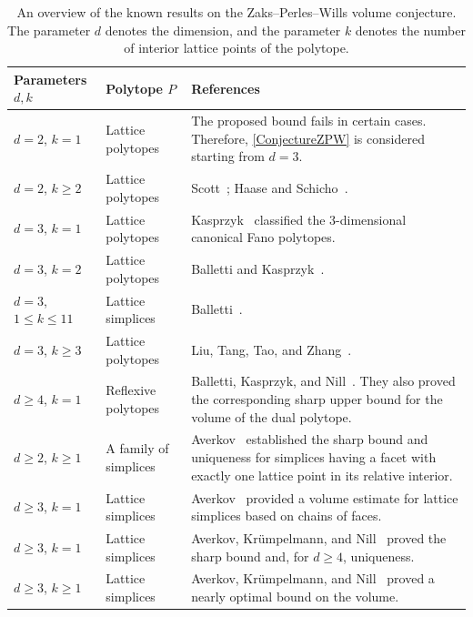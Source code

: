 \documentclass[reqno, 11pt]{article}
\numberwithin{equation}{section}
\theoremstyle{definition}
\begin{document}
\begin{table}[htbp]
\centering\small
\begin{tabularx}{\textwidth}{l|l|>{\raggedright\arraybackslash}X}
\toprule
Parameters $d,k$ & Polytope $P$ & References\\
\midrule
$d=2$, $k=1$ & Lattice polytopes &
The proposed bound fails in certain cases. Therefore,
\cref{ConjectureZPW} is considered starting from $d=3$.\\
$d=2$, $k\geq2$ & Lattice polytopes &
Scott~\cite{Scott1976}; Haase and Schicho~\cite{HaaseSch09}.\\
\hline
$d=3$, $k=1$ & Lattice polytopes &
Kasprzyk~\cite{Kas10} classified the $3$-dimensional canonical Fano
polytopes.\\
$d=3$, $k=2$ & Lattice polytopes &
Balletti and Kasprzyk~\cite[Corollary~5.2]{BK2016}.\\
$d=3$, $1\leq k\leq11$ & Lattice simplices &
Balletti~\cite[Corollary~7.5 and Theorem~7.7]{Bal21}.\\
$d=3$, $k\geq3$ & Lattice polytopes &
Liu, Tang, Tao, and Zhang~\cite{LTTZ26}.\\
\hline
$d\geq4$, $k=1$ & Reflexive polytopes &
Balletti, Kasprzyk, and Nill~\cite[Corollary~1.2]{BKN22}.
They also proved the corresponding sharp upper bound for the volume
of the dual polytope.\\
$d\geq2$, $k\geq1$ & A family of simplices &
Averkov~\cite[Theorem~3]{ALocal} established the sharp bound and
uniqueness for simplices having a facet with exactly one lattice point
in its relative interior.\\
$d\geq3$, $k=1$ & Lattice simplices &
Averkov~\cite{Ave12} provided a volume estimate for lattice simplices
based on chains of faces.\\
$d\geq3$, $k=1$ & Lattice simplices &
Averkov, Kr\"umpelmann, and Nill~\cite[Theorem~2.2]{AKN} proved the sharp bound and, for $d\ge4$, uniqueness.\\
$d\geq3$, $k\geq1$ & Lattice simplices &
Averkov, Kr\"umpelmann, and Nill~\cite[Theorem~1.2]{AKN2020} proved
a nearly optimal bound on the volume.\\
\bottomrule
\end{tabularx}
\caption{An overview of the known results on the Zaks--Perles--Wills volume conjecture. The parameter $d$ denotes the dimension,
and the parameter $k$ denotes the number of interior lattice points
of the polytope.}\label{tab:Volume}
\end{table}
\end{document}
